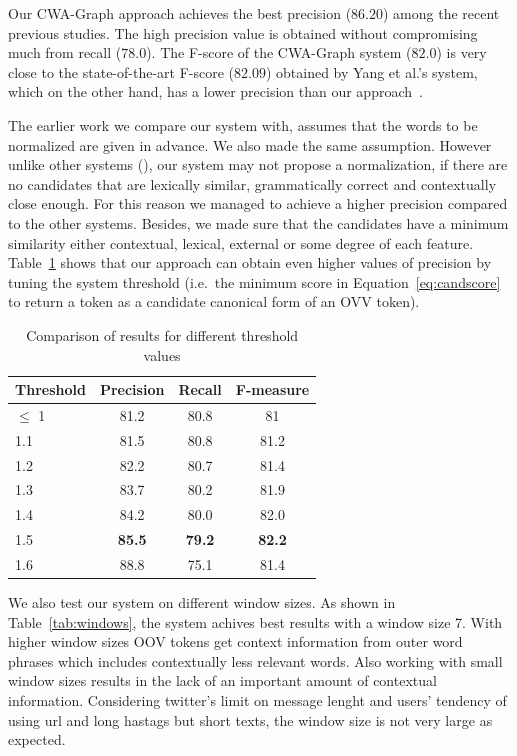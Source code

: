 \documentclass[a4paper,onesided,12pt]{report}
\begin{document}
Our CWA-Graph approach achieves the best precision ($86.20$) among the recent previous studies. The high precision value is obtained without compromising much from recall ($78.0$). The F-score of the CWA-Graph system ($82.0$) is very close to the state-of-the-art F-score ($82.09$) obtained by Yang et al.'s system, which on the other hand, has a lower precision than our approach~\cite{DBLP:conf/emnlp/YangE13}.

The earlier work we compare our system with, assumes that the words to be normalized are given in advance. We also made the same assumption. However unlike other systems (\cite{DBLP:conf/emnlp/YangE13,liu2012broad,Han:2011:LNS:2002472.2002520}), our system may not propose a normalization, if there are no candidates that are lexically similar, grammatically correct and contextually close enough. For this reason we managed to achieve a higher precision compared to the other systems. Besides, we made sure that the candidates have a minimum similarity either contextual, lexical, external or some degree of each feature. Table~\ref{tab:thresholds} shows that our approach can obtain even higher values of precision by tuning the system threshold (i.e.~the minimum score in Equation~\ref{eq:candscore} to return a token as a candidate canonical form of an OVV token).

\begin{table}[thb]
  \caption{Comparison of results for different threshold values}
  \centering
  \begin{tabular}[th]{lccc}
    \hline
    Threshold & Precision & Recall & F-measure \\
    \hline
    $\leq$ 1 & 81.2 &	80.8 &	81 \\
    1.1 & 81.5 & 80.8 &	81.2 \\
    1.2 & 82.2 &	80.7 &	81.4 \\
    1.3 & 83.7 &	80.2 &	81.9 \\
    1.4 & 84.2 &	80.0 &	82.0 \\
    1.5 & \textbf{85.5} &  \textbf{79.2} &  \textbf{82.2} \\
    1.6 & 88.8	& 75.1	& 81.4 \\
    \hline
  \end{tabular}
\label{tab:thresholds}
\end{table}

We also test our system on different window sizes. As shown in Table~\ref{tab:windows}, the system achives best results with a window size 7. With higher window sizes OOV tokens get context information from outer word phrases which includes contextually less relevant words. Also working with small window sizes results in the lack of an important amount of contextual information. Considering twitter's limit on message lenght and users' tendency of using url and long hastags but short texts, the window size is not very large as expected.
\end{document}
